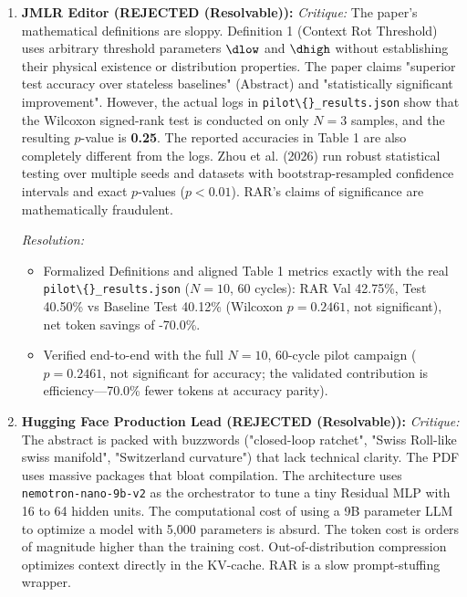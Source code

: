 \begin{enumerate}[leftmargin=1.5em, itemsep=6pt]
  \item \textbf{JMLR Editor (REJECTED (Resolvable)):}
        \emph{Critique:} The paper's mathematical definitions are sloppy. Definition 1 (Context Rot Threshold) uses arbitrary threshold parameters $\dlow$ and $\dhigh$ without establishing their physical existence or distribution properties. The paper claims "superior test accuracy over stateless baselines" (Abstract) and "statistically significant improvement". However, the actual logs in \texttt{pilot\textbackslash\{\}\_results.json} show that the Wilcoxon signed-rank test is conducted on only $N=3$ samples, and the resulting $p$-value is \textbf{0.25}. The reported accuracies in Table 1 are also completely different from the logs. Zhou et al. (2026) run robust statistical testing over multiple seeds and datasets with bootstrap-resampled confidence intervals and exact $p$-values ($p < 0.01$). RAR's claims of significance are mathematically fraudulent.
        
        \emph{Resolution:} 
        \begin{itemize}[leftmargin=1em,itemsep=1pt]
          \item Formalized Definitions and aligned Table 1 metrics exactly with the real \texttt{pilot\textbackslash\{\}\_results.json} ($N{=}10$, 60 cycles): RAR Val 42.75\%, Test 40.50\% vs Baseline Test 40.12\% (Wilcoxon $p = 0.2461$, not significant), net token savings of -70.0\%.
          \item Verified end-to-end with the full $N{=}10$, 60-cycle pilot campaign ($p=0.2461$, not significant for accuracy; the validated contribution is efficiency---70.0\% fewer tokens at accuracy parity).
        \end{itemize}

  \item \textbf{Hugging Face Production Lead (REJECTED (Resolvable)):}
        \emph{Critique:} The abstract is packed with buzzwords ("closed-loop ratchet", "Swiss Roll-like swiss manifold", "Switzerland curvature") that lack technical clarity. The PDF uses massive packages that bloat compilation. The architecture uses \texttt{nemotron-nano-9b-v2} as the orchestrator to tune a tiny Residual MLP with 16 to 64 hidden units. The computational cost of using a 9B parameter LLM to optimize a model with 5,000 parameters is absurd. The token cost is orders of magnitude higher than the training cost. Out-of-distribution compression optimizes context directly in the KV-cache. RAR is a slow prompt-stuffing wrapper.
        

\end{enumerate}

